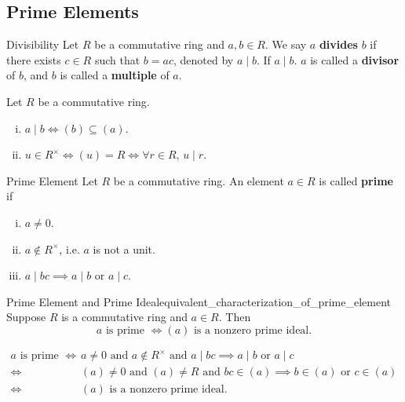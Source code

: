 \subsection{Prime Elements}
\begin{definition}{Divisibility}{}
    Let $R$ be a commutative ring and $a,b\in R$. We say $a$ \textbf{divides} $b$ if there exists $c\in R$ such that $b=ac$, denoted by $a\mid b$. If $a\mid b$. $a$ is called a \textbf{divisor} of $b$, and $b$ is called a \textbf{multiple} of $a$.
\end{definition}


\begin{proposition}{}{}
    Let $R$ be a commutative ring.
    \begin{enumerate}[(i)]
        \item $a \mid b\iff(b) \subseteq (a)$.
        \item $u\in R^\times \iff (u) = R  \iff \forall r\in R,\,u\mid r$.
    \end{enumerate}
\end{proposition}

\begin{definition}{Prime Element}{}
    Let $R$ be a commutative ring. An element $a\in R$ is called \textbf{prime} if
    \begin{enumerate}[(i)]
        \item $a\ne 0$.
        \item $a\notin R^\times$, i.e. $a$ is not a unit.
        \item $a\mid bc\implies a\mid b\text{ or }a\mid c$.
    \end{enumerate}
\end{definition}



\begin{proposition}{Prime Element and Prime Ideal}{equivalent_characterization_of_prime_element}
    Suppose $R$ is a commutative ring and $a\in R$. Then
    \[
        a\text{ is prime }\iff (a)\text{ is a nonzero prime ideal}.
    \]
\end{proposition}

\begin{prf}
    \begin{align*}
        a\text{ is prime }\iff &a\ne 0\text{ and }a\notin R^\times\text{ and }a\mid bc\implies a\mid b\text{ or }a\mid c\\
        \iff &(a)\ne 0\text{ and }(a)\ne R\text{ and }bc\in (a)\implies b\in (a)\text{ or }c\in (a)\\
        \iff &(a)\text{ is a nonzero prime ideal}.
    \end{align*}
\end{prf}

